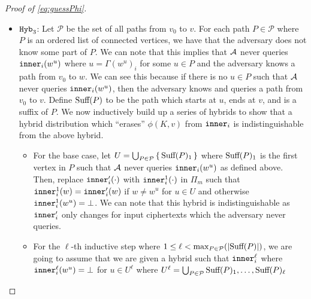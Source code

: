 \begin{proof}[Proof of \cref{eq:guessPhi}]
\begin{itemize}
		Note that the replacement of $\Hyb_{2a}$ and $\Hyb_{2b}$ are repeated multiple times.
		Specifically, these replacements are repeated at most $\alpha$ times where $\alpha$ is the number
		of unique times $\advers$ runs $\FEDec(\SK_{\inner_i}, \phi(K, w))$.



		\item $\texttt{Hyb}_3$: Let $\mathcal{P}$ be the set of all paths from $v_0$ to $v$. For each path $P \in \mathcal{P}$
		where $P$ is an ordered list of connected vertices, we have that the adversary does not know
		some part of $P$. We can note that this implies that $\advers$ never queries
		$\texttt{inner}_i(w^u)$ where $u = \Gamma(w^u)_i$ for some $u \in P$ and the adversary knows a path from $v_0$ to $w$.
		We can see this because if there is no $u \in P$ such that $\advers$ never queries $\texttt{inner}_i(w^u)$,
		then the adversary knows and queries a path from $v_0$ to $v$. Define $\text{Suff}(P)$ to be the path 
		which starts at $u$, ends at $v$, and is a suffix of $P$.
		We now inductively build up a series of hybrids to show that a hybrid distribution
		which ``erases'' $\phi(K, v)$ from $\texttt{inner}_i$ is indistinguishable from the above hybrid.
		\begin{itemize}
			\item For the base case, let $U = \bigcup_{P \in \mathcal{P}} \set{\text{Suff}(P)_1}$
			where $\text{Suff}(P)_1$ is the first vertex in $P$ such that $\advers$ never queries $\texttt{inner}_i(w^u)$ as defined above.
			Then, replace $\texttt{inner}_i'(\cdot)$ with $\texttt{inner}_i^1(\cdot)$ in $\Pi_m$ such that $\texttt{inner}_i^1(w) = \texttt{inner}_i'(w)$
			if $w \neq w^u$ for $u \in U$ and otherwise $\texttt{inner}_i^1(w^u) = \bot$. We can note that this hybrid is indistinguishable as
			$\texttt{inner}_i'$ only changes for input ciphertexts which the adversary never queries.
			\item For the $\ell$-th inductive step where $1 \leq \ell < \max_{P \in \mathcal{P}}(|\text{Suff}(P)|)$, we are going to assume that we are given a hybrid such that $\texttt{inner}_i^\ell$ where $\texttt{inner}_i^\ell(w^u) = \bot$
			for $u \in U^\ell$ where $U^\ell = \bigcup_{P \in \mathcal{P}} \text{Suff}(P)_1, \dots, \text{Suff}(P)_\ell$

\end{itemize}
\end{itemize}
\end{proof}
